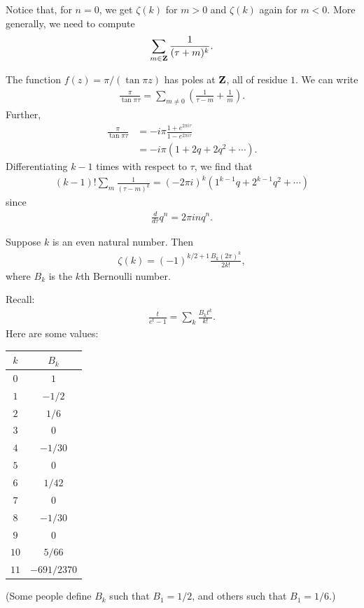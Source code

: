\documentclass[11pt, oneside,margin=1in]{article}
\begin{document}
Notice that, for $n=0$, we get $\zeta(k)$ for $m>0$ and $\zeta(k)$ again for $m<0$. More generally, we need to compute 
\begin{align*}
	\sum_{m\in\mathbf Z}^{} \frac{1}{(\tau + m) ^k}.
\end{align*}

The function $f(z) = \pi/(\tan \pi z)$ has poles at $\mathbf Z$, all of residue $1$. We can write
\begin{align*}
	\frac{\pi}{\tan \pi \tau} = \sum_{m\ne 0}^{} \left( \frac{1}{\tau - m}+\frac{1}{m} \right
		).
\end{align*}
Further,
\begin{align*}
	\frac{\pi}{\tan \pi \tau}&= -i\pi \frac{1+e^{2\pi i\tau}}{1-e^{2\pi i\tau}} \\
				 &= -i\pi (1+2q+2q^2 + \cdots).
\end{align*}
Differentiating $k-1$ times with respect to $\tau$, we find that 
\begin{align*}
	(k-1) ! \sum_{m}^{} \frac{1}{(\tau-m) ^k} = (-2\pi i)^k  (1^{k-1}q + 2^{k-1}q^2 + \cdots)
\end{align*}
since
\begin{align*}
	\frac{d}{d\tau} q^n = 2\pi i n q^n.
\end{align*}

\begin{proposition}[ ]\label{}\text{}
Suppose $k$ is an even natural number. Then
	\begin{align*}
	\zeta(k) = (-1)^{k/2 + 1} \frac{B_k (2\pi)^k}{2k!},
\end{align*}
where $B_k$ is the $k$th Bernoulli number.
\end{proposition}

Recall:
\begin{align*}
	\frac{t}{e^t-1}=\sum_{k}^{} \frac{B_kt^k}{k!}.
\end{align*}
Here are some values:
\begin{center}
\begin{tabular}{cc}
$k$ & $B_k$\\
\midrule
$0 $ & $1 $\\
$ 1$ & $-1/2 $\\
$2 $ & $1/6 $\\
$3 $ & $0 $\\
$4 $ & $-1/30 $\\
$ 5$ & $0 $\\
$6 $ & $1/42 $\\
$7 $ & $0 $\\
$8 $ & $-1/30 $\\
$ 9$ & $0 $\\
$10 $ & $5/66 $\\
$11 $ & $-691/2370 $\\
\end{tabular}
\end{center}
(Some people define $B_k$ such that $B_1=1/2$, and others such that $B_1 = 1/6$.)
\end{document}

